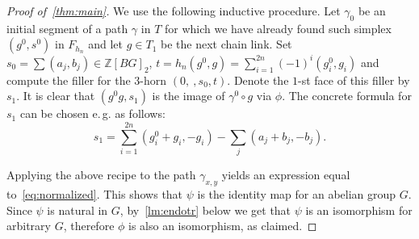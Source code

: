 \documentclass[oneside, 12pt]{amsart}
\theoremstyle{plain}
\numberwithin{equation}{section}
\numberwithin{lemma}{section}
\theoremstyle{remark}
\theoremstyle{definition}
\newcommand{\ZZ}{\mathbb{Z}}
\begin{document}
\begin{proof}[Proof of~\cref{thm:main}]
We use the following inductive procedure. Let $\gamma_0$ be an initial segment of a path $\gamma$ in $T$ for which we have already found such simplex
 $(g^0, s^0)$ in $F_{h_n}$ and let $g \in T_1$ be the next chain link. 
Set $s_0 = \sum (a_j, b_j) \in\ZZ[BG]_2$, $t = h_n (g^0, g) = \sum_{i=1}^{2n}(-1)^i(g^0_i, g_i)$
and compute the filler for the $3$-horn $(0,\ , s_0, t)$. Denote the $1$-st face of this filler by $s_1$.
It is clear that $(g^0g, s_1)$ is the image of $\gamma^0 \circ g$ via $\phi$.
The concrete formula for $s_1$ can be chosen e.\,g. as follows:
\[s_1 = \sum_{i=1}^{2n}(g^0_i + g_i, -g_i) - \sum_j (a_j + b_j, -b_j).\]

Applying the above recipe to the path $\gamma_{x, y}$ yields an expression equal to~\eqref{eq:normalized}.
 This shows that $\psi$ is the identity map for an abelian group $G$.
Since $\psi$ is natural in $G$, by~\cref{lm:endotr} below we get that $\psi$ is an isomorphism for arbitrary $G$,
 therefore $\phi$ is also an isomorphism, as claimed.
\end{proof}
\end{document}

